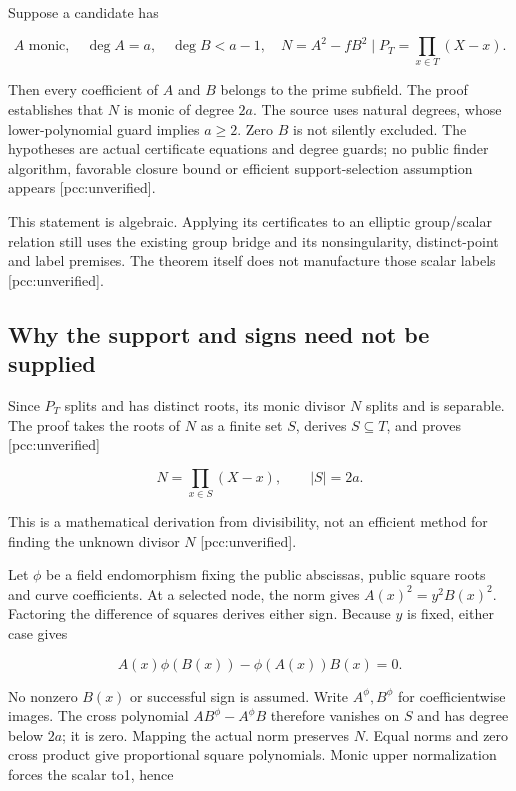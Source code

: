 \documentclass[
  10pt,
]{article}
\begin{document}
Suppose a candidate has

\[
A\text{ monic},\quad \deg A=a,\quad \deg B<a-1,\quad
N=A^2-fB^2\mid P_T=\prod_{x\in T}(X-x).
\]

Then every coefficient of \(A\) and \(B\) belongs to the prime subfield.
The proof establishes that \(N\) is monic of degree \(2a\). The source
uses natural degrees, whose lower-polynomial guard implies \(a\ge2\).
Zero \(B\) is not silently excluded. The hypotheses are actual
certificate equations and degree guards; no public finder algorithm,
favorable closure bound or efficient support-selection assumption
appears {[}pcc:unverified{]}.

This statement is algebraic. Applying its certificates to an elliptic
group/scalar relation still uses the existing group bridge and its
nonsingularity, distinct-point and label premises. The theorem itself
does not manufacture those scalar labels {[}pcc:unverified{]}.

\subsection{Why the support and signs need not be
supplied}\label{why-the-support-and-signs-need-not-be-supplied}

Since \(P_T\) splits and has distinct roots, its monic divisor \(N\)
splits and is separable. The proof takes the roots of \(N\) as a finite
set \(S\), derives \(S\subseteq T\), and proves {[}pcc:unverified{]}

\[N=\prod_{x\in S}(X-x),\qquad |S|=2a.\]

This is a mathematical derivation from divisibility, not an efficient
method for finding the unknown divisor \(N\) {[}pcc:unverified{]}.

Let \(\phi\) be a field endomorphism fixing the public abscissas, public
square roots and curve coefficients. At a selected node, the norm gives
\(A(x)^2=y^2B(x)^2\). Factoring the difference of squares derives either
sign. Because \(y\) is fixed, either case gives

\[A(x)\phi(B(x))-\phi(A(x))B(x)=0.\]

No nonzero \(B(x)\) or successful sign is assumed. Write
\(A^\phi,B^\phi\) for coefficientwise images. The cross polynomial
\(AB^\phi-A^\phi B\) therefore vanishes on \(S\) and has degree below
\(2a\); it is zero. Mapping the actual norm preserves \(N\). Equal norms
and zero cross product give proportional square polynomials. Monic upper
normalization forces the scalar to1, hence
\end{document}
